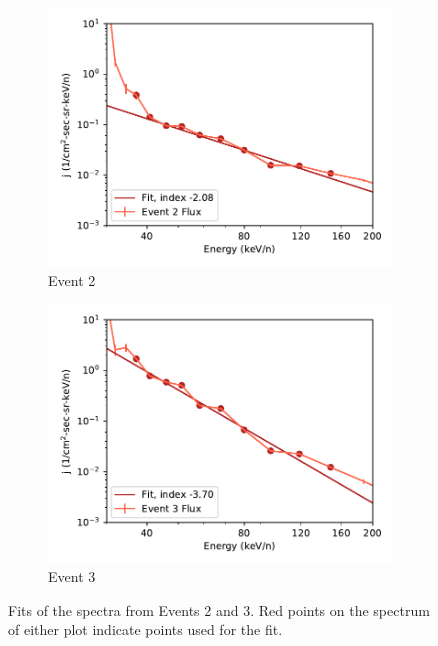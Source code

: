 \documentclass[letterpaper,11pt]{article}
\begin{document}
\begin{figure}[htbp]
\centering
\begin{subfigure}{.45\textwidth}
\centering
\includegraphics[width=1.\linewidth]{figures/spectrum_02.pdf}
\caption{Event 2}
\end{subfigure}
\begin{subfigure}{.45\textwidth}
\centering
\includegraphics[width=1.\linewidth]{figures/spectrum_03.pdf}
\caption{Event 3}
\end{subfigure}
\caption{Fits of the spectra from Events 2 and  3.  Red points on the spectrum of either plot indicate points used for the fit.}
\label{fig:naive_fits}
\end{figure}
\end{document}
